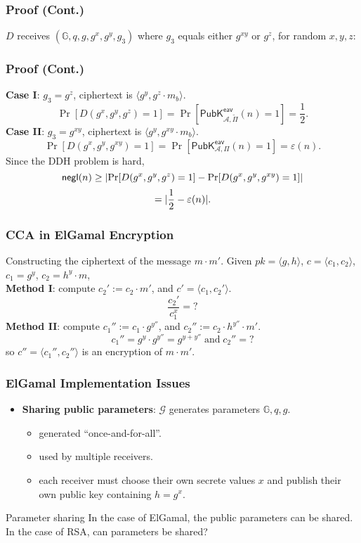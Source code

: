\begin{frame}\frametitle{Proof (Cont.)}
$D$ receives $(\mathbb{G},q,g,g^x,g^y,g_3)$ where $g_3$ equals either $g^{xy}$ or $g^z$, for random $x, y, z$:
\begin{figure}
\begin{center}

\end{center}
\end{figure}
\end{frame}
\begin{frame}\frametitle{Proof (Cont.)}
\textbf{Case I}: $g_3 = g^z$, ciphertext is $\langle g^y, g^z\cdot m_b\rangle$.\\
\[ \Pr[D(g^x,g^y,g^z)=1] = \Pr\left[\mathsf{PubK}^{\mathsf{eav}}_{\mathcal{A},\tilde{\Pi}}(n)=1\right] = \frac{1}{2}.\]
\textbf{Case II}: $g_3 = g^{xy}$, ciphertext is $\langle g^y, g^{xy}\cdot m_b\rangle$.\\
\[ \Pr[D(g^x,g^y,g^{xy})=1] = \Pr\left[\mathsf{PubK}^{\mathsf{eav}}_{\mathcal{A},\Pi}(n)=1\right] = \varepsilon(n).\]
Since the DDH problem is hard,
\[  \mathsf{negl}(n) \ge \lvert\Pr[D(g^x,g^y,g^z)=1] - \Pr[D(g^x,g^y,g^{xy})=1]\rvert\]
\[ =\lvert\frac{1}{2}-\varepsilon(n)\rvert. \]
\end{frame}
\begin{frame}\frametitle{CCA in ElGamal Encryption}
\begin{exampleblock}{Constructing the ciphertext of the message $m\cdot m'$.}
Given $pk=\langle g, h\rangle$, $c = \langle c_1, c_2\rangle$, $c_1=g^y$, $c_2=h^y\cdot m$, \\ \textbf{Method I}: compute
$c_2' := c_2\cdot m'$, and $c' = \langle c_1, c_2'\rangle$.
\[\frac{c_2'}{c_1^x} = ? \]%
\textbf{Method II}: compute $c_1'' := c_1\cdot g^{y''}$, and $c_2'' := c_2\cdot h^{y''}\cdot m'$.
\[c_1''=g^y\cdot g^{y''} = g^{y+y''}\;\text{and}\; c_2''= ? \] %
so $c''=\langle c_1'',c_2''\rangle$ is an encryption of $m\cdot m'$.
\end{exampleblock}
\end{frame}
\begin{frame}\frametitle{ElGamal Implementation Issues}
\begin{itemize}
\item \textbf{Sharing public parameters}: $\mathcal{G}$ generates parameters $\mathbb{G},q,g$.
\begin{itemize}
\item generated ``once-and-for-all''.
\item used by multiple receivers.
\item each receiver must choose their own secrete values $x$ and publish their own public key containing $h=g^x$.
\end{itemize}
\end{itemize}
\begin{alertblock}{Parameter sharing}
In the case of ElGamal, the public parameters can be shared. In the case of RSA, can parameters be shared?
\end{alertblock}
\end{frame}
